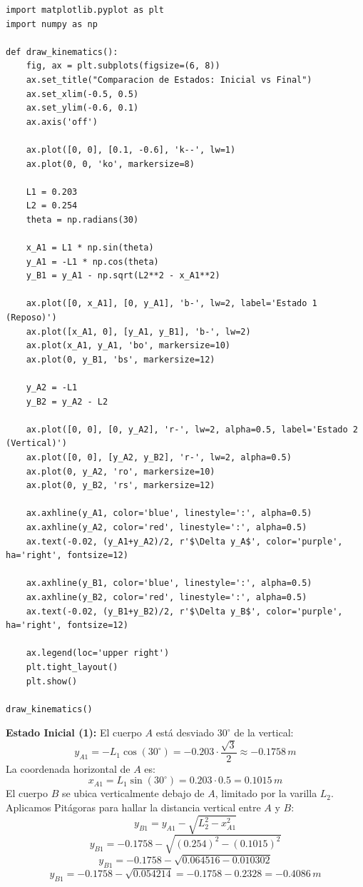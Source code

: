 \documentclass[12pt, a4paper]{article}
\begin{document}
\begin{lstlisting}
import matplotlib.pyplot as plt
import numpy as np

def draw_kinematics():
    fig, ax = plt.subplots(figsize=(6, 8))
    ax.set_title("Comparacion de Estados: Inicial vs Final")
    ax.set_xlim(-0.5, 0.5)
    ax.set_ylim(-0.6, 0.1)
    ax.axis('off')
    
    ax.plot([0, 0], [0.1, -0.6], 'k--', lw=1)
    ax.plot(0, 0, 'ko', markersize=8)
    
    L1 = 0.203
    L2 = 0.254
    theta = np.radians(30)
    
    x_A1 = L1 * np.sin(theta)
    y_A1 = -L1 * np.cos(theta)
    y_B1 = y_A1 - np.sqrt(L2**2 - x_A1**2)
    
    ax.plot([0, x_A1], [0, y_A1], 'b-', lw=2, label='Estado 1 (Reposo)')
    ax.plot([x_A1, 0], [y_A1, y_B1], 'b-', lw=2)
    ax.plot(x_A1, y_A1, 'bo', markersize=10)
    ax.plot(0, y_B1, 'bs', markersize=12)
    
    y_A2 = -L1
    y_B2 = y_A2 - L2
    
    ax.plot([0, 0], [0, y_A2], 'r-', lw=2, alpha=0.5, label='Estado 2 (Vertical)')
    ax.plot([0, 0], [y_A2, y_B2], 'r-', lw=2, alpha=0.5)
    ax.plot(0, y_A2, 'ro', markersize=10)
    ax.plot(0, y_B2, 'rs', markersize=12)
    
    ax.axhline(y_A1, color='blue', linestyle=':', alpha=0.5)
    ax.axhline(y_A2, color='red', linestyle=':', alpha=0.5)
    ax.text(-0.02, (y_A1+y_A2)/2, r'$\Delta y_A$', color='purple', ha='right', fontsize=12)
    
    ax.axhline(y_B1, color='blue', linestyle=':', alpha=0.5)
    ax.axhline(y_B2, color='red', linestyle=':', alpha=0.5)
    ax.text(-0.02, (y_B1+y_B2)/2, r'$\Delta y_B$', color='purple', ha='right', fontsize=12)
    
    ax.legend(loc='upper right')
    plt.tight_layout()
    plt.show()

draw_kinematics()
\end{lstlisting}

\textbf{Estado Inicial (1):}
El cuerpo $A$ está desviado $30^\circ$ de la vertical:
$$ y_{A1} = -L_1 \cos(30^\circ) = -0.203 \cdot \frac{\sqrt{3}}{2} \approx -0.1758 \, \si{m} $$
La coordenada horizontal de $A$ es:
$$ x_{A1} = L_1 \sin(30^\circ) = 0.203 \cdot 0.5 = 0.1015 \, \si{m} $$
El cuerpo $B$ se ubica verticalmente debajo de $A$, limitado por la varilla $L_2$. Aplicamos Pitágoras para hallar la distancia vertical entre $A$ y $B$:
$$ y_{B1} = y_{A1} - \sqrt{L_2^2 - x_{A1}^2} $$
$$ y_{B1} = -0.1758 - \sqrt{(0.254)^2 - (0.1015)^2} $$
$$ y_{B1} = -0.1758 - \sqrt{0.064516 - 0.010302} $$
$$ y_{B1} = -0.1758 - \sqrt{0.054214} = -0.1758 - 0.2328 = -0.4086 \, \si{m} $$
\end{document}
